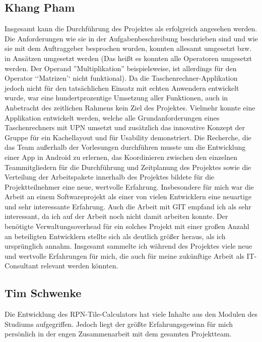 \subsection{Khang Pham}
Insgesamt kann die Durchführung des Projektes als erfolgreich angesehen werden. Die Anforderungen wie sie in der Aufgabenbeschreibung beschrieben sind und wie sie mit dem Auftraggeber besprochen wurden, konnten allesamt umgesetzt bzw. in Ansätzen umgesetzt werden (Das heißt es konnten alle Operatoren umgesetzt werden. Der Operand ''Multiplikation'' beispielsweise, ist allerdings für den Operator ‘‘Matrizen’‘ nicht funktional). Da die Taschenrechner-Applikation jedoch nicht für den tatsächlichen Einsatz mit echten Anwendern entwickelt wurde, war eine hundertprozentige Umsetzung aller Funktionen, auch in Anbetracht des zeitlichen Rahmens kein Ziel des Projektes. Vielmehr konnte eine Applikation entwickelt werden, welche alle Grundanforderungen eines Taschenrechners mit UPN umsetzt und zusätzlich das innovative Konzept der Gruppe für ein Kachellayout und für Usability demonstriert. Die Recherche, die das Team außerhalb der Vorlesungen durchführen musste um die Entwicklung einer App in Android zu erlernen, das Koordinieren zwischen den einzelnen Teammitgliedern für die Durchführung und Zeitplanung des Projektes sowie die Verteilung der Arbeitspakete innerhalb des Projektes bildete für die Projektteilnehmer eine neue, wertvolle Erfahrung.
Insbesondere für mich war die Arbeit an einem Softwareprojekt als einer von vielen Entwicklern eine neuartige und sehr interessante Erfahrung. Auch die Arbeit mit GIT empfand ich als sehr interessant, da ich auf der Arbeit noch nicht damit arbeiten konnte. Der benötigte Verwaltungsoverhead für ein solches Projekt mit einer großen Anzahl an beteiligten Entwicklern stellte sich als deutlich größer heraus, als ich ursprünglich annahm. Insgesamt sammelte ich während des Projektes viele neue und wertvolle Erfahrungen für mich, die auch für meine zukünftige Arbeit als IT-Consultant relevant werden könnten. 

\clearpage

\subsection{Tim Schwenke}

Die Entwicklung des RPN-Tile-Calculators hat viele Inhalte aus den Modulen des Studiums aufgegriffen. Jedoch liegt der grö\ss te Erfahrungsgewinn für mich persönlich in der engen Zusammenarbeit mit dem gesamten Projektteam.

